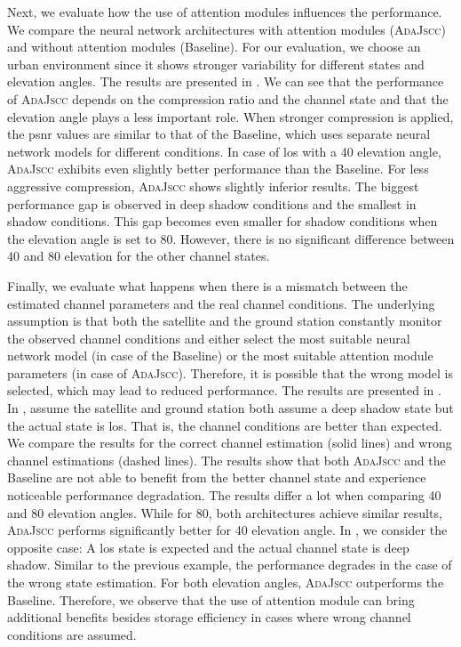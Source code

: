 \documentclass[conference]{IEEEtran}
\newcommand\ours{\textsc{AdaJscc}\xspace}
\newcommand\baseline{Baseline\xspace}
\begin{document}
Next, we evaluate how the use of attention modules influences the performance.
We compare the neural network architectures with attention modules (\ours) and without attention modules (\baseline).
For our evaluation, we choose an urban environment since it shows stronger variability for different states and elevation angles.
The results are presented in .
We can see that the performance of \ours depends on the compression ratio and the channel state and that the elevation angle plays a less important role. 
When stronger compression is applied, the \ac{psnr} values are similar to that of the \baseline, which uses separate neural network models for different conditions. 
In case of \ac{los} with a 40\textdegree{} elevation angle, \ours exhibits even slightly better performance than the \baseline.
For less aggressive compression, \ours shows slightly inferior results.
The biggest performance gap is observed in deep shadow conditions and the smallest in shadow conditions. 
This gap becomes even smaller for shadow conditions when the elevation angle is set to 80\textdegree{}. 
However, there is no significant difference between 40\textdegree{} and 80\textdegree{} elevation for the other channel states.

Finally, we evaluate what happens when there is a mismatch between the estimated channel parameters and the real channel conditions. 
The underlying assumption is that both the satellite and the ground station constantly monitor the observed channel conditions and either select the most suitable neural network model (in case of the \baseline) or the most suitable attention module parameters (in case of \ours).
Therefore, it is possible that the wrong model is selected, which may lead to reduced performance.
The results are presented in .
In , assume the satellite and ground station both assume a deep shadow state but the actual state is \ac{los}. 
That is, the channel conditions are better than expected. 
We compare the results for the correct channel estimation (solid lines) and wrong channel estimations (dashed lines).
The results show that both \ours and the \baseline are not able to benefit from the better channel state and experience noticeable performance degradation.
The results differ a lot when comparing 40\textdegree{} and 80\textdegree{} elevation angles.
While for 80\textdegree{}, both architectures achieve similar results, 
\ours performs significantly better for 40\textdegree{} elevation angle.
In , we consider the opposite case: 
A \ac{los} state is expected and the actual channel state is deep shadow. 
Similar to the previous example, the performance degrades in the case of the wrong state estimation.
For both elevation angles, \ours outperforms the \baseline.
Therefore, we observe that the use of attention module can bring additional benefits besides storage efficiency in cases where wrong channel conditions are assumed.
\end{document}
